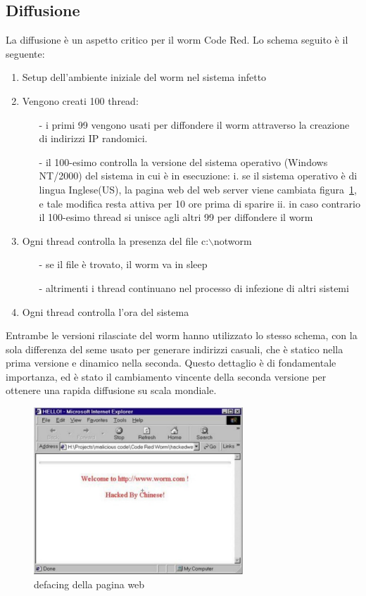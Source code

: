 \subsection{Diffusione}
La diffusione è un aspetto critico per il worm Code Red. Lo schema seguito è il seguente:\\
\begin{enumerate}
\item Setup dell’ambiente iniziale del worm nel sistema infetto
\item Vengono creati 100 thread:
\begin{itemize}
\item[-]i primi 99 vengono usati per diffondere il worm attraverso la creazione di indirizzi IP randomici.
\item[-]il 100-esimo controlla la versione del sistema operativo (Windows NT/2000) del sistema in cui è in esecuzione:
i. se il sistema operativo è di lingua Inglese(US), la pagina web del web server viene cambiata figura~\ref{hacked}, e tale modifica resta attiva per 10 ore prima di sparire
ii. in caso contrario il 100-esimo thread si unisce agli altri 99 per diffondere il worm
\end{itemize}
\item Ogni thread controlla la presenza del file c:$\backslash$notworm
\begin{itemize}
\item[-]se il file è trovato, il worm va in sleep
\item[-]altrimenti i thread continuano nel processo di infezione di altri sistemi
\end{itemize}
\item Ogni thread controlla l’ora del sistema 
\end{enumerate}
Entrambe le versioni rilasciate del worm hanno utilizzato lo stesso schema, con la sola differenza del seme usato per generare indirizzi casuali, che è statico nella prima versione e dinamico nella seconda. Questo dettaglio è di fondamentale importanza, ed è stato il cambiamento vincente della seconda versione per ottenere una rapida diffusione su scala mondiale.\\
\begin{figure}[!h]
\centering
\includegraphics[width=0.7\textwidth]{images/hacked.eps}
\caption{defacing della pagina web}
\label{hacked}
\end{figure}
